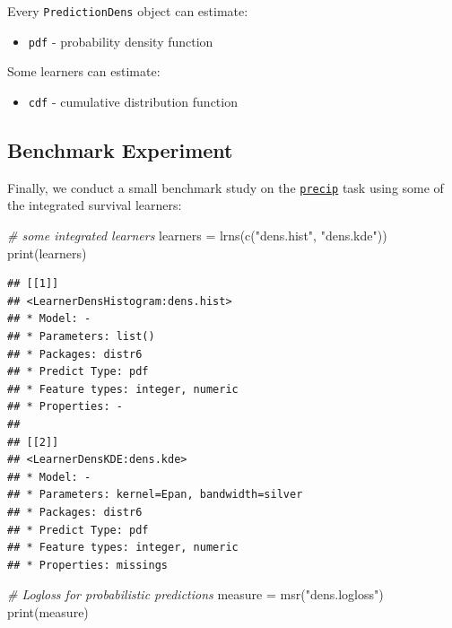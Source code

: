\documentclass[
]{scrbook}
\newenvironment{Shaded}{\begin{snugshade}}{\end{snugshade}}
\newcommand{\CommentTok}[1]{\textcolor[rgb]{0.56,0.35,0.01}{\textit{#1}}}
\newcommand{\FunctionTok}[1]{\textcolor[rgb]{0.00,0.00,0.00}{#1}}
\newcommand{\NormalTok}[1]{#1}
\newcommand{\OtherTok}[1]{\textcolor[rgb]{0.56,0.35,0.01}{#1}}
\newcommand{\StringTok}[1]{\textcolor[rgb]{0.31,0.60,0.02}{#1}}
\providecommand{\tightlist}{%
  \setlength{\itemsep}{0pt}\setlength{\parskip}{0pt}}
\renewenvironment{Shaded} {\begin{snugshade}\small} {\end{snugshade}}
\begin{document}
Every \texttt{PredictionDens} object can estimate:

\begin{itemize}
\tightlist
\item
  \texttt{pdf} - probability density function
\end{itemize}

Some learners can estimate:

\begin{itemize}
\tightlist
\item
  \texttt{cdf} - cumulative distribution function
\end{itemize}

\hypertarget{benchmark-experiment-1}{%
\subsection{Benchmark Experiment}\label{benchmark-experiment-1}}

Finally, we conduct a small benchmark study on the \href{https://mlr3proba.mlr-org.com/reference/mlr_tasks_precip.html}{\texttt{precip}} task using some of the integrated survival learners:

\begin{Shaded}
\begin{Highlighting}[]
\CommentTok{\# some integrated learners}
\NormalTok{learners }\OtherTok{=} \FunctionTok{lrns}\NormalTok{(}\FunctionTok{c}\NormalTok{(}\StringTok{"dens.hist"}\NormalTok{, }\StringTok{"dens.kde"}\NormalTok{))}
\FunctionTok{print}\NormalTok{(learners)}
\end{Highlighting}
\end{Shaded}

\begin{verbatim}
## [[1]]
## <LearnerDensHistogram:dens.hist>
## * Model: -
## * Parameters: list()
## * Packages: distr6
## * Predict Type: pdf
## * Feature types: integer, numeric
## * Properties: -
## 
## [[2]]
## <LearnerDensKDE:dens.kde>
## * Model: -
## * Parameters: kernel=Epan, bandwidth=silver
## * Packages: distr6
## * Predict Type: pdf
## * Feature types: integer, numeric
## * Properties: missings
\end{verbatim}

\begin{Shaded}
\begin{Highlighting}[]
\CommentTok{\# Logloss for probabilistic predictions}
\NormalTok{measure }\OtherTok{=} \FunctionTok{msr}\NormalTok{(}\StringTok{"dens.logloss"}\NormalTok{)}
\FunctionTok{print}\NormalTok{(measure)}
\end{Highlighting}
\end{Shaded}
\end{document}
